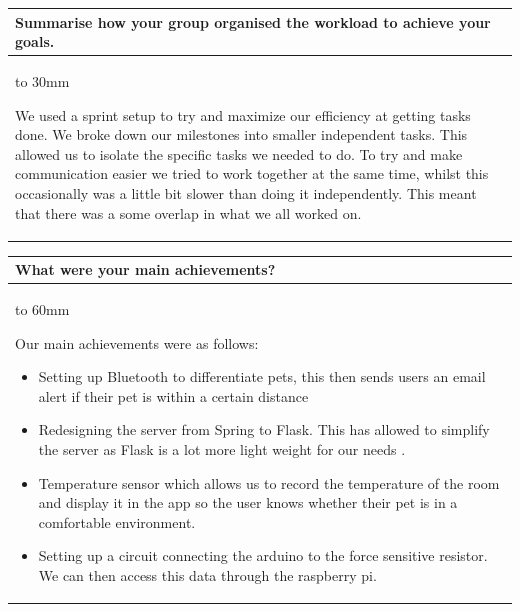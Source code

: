 \documentclass[a4paper]{article}
\newcommand{\colWidth}{141mm}
\begin{document}
\begin{center}
\begin{tabular}{|p{\colWidth}|}
	\hline
	\cellcolor{blue!25}\large
	\textbf{Summarise how your group organised the workload to achieve your goals.}
	\\ \hline
	\vtop to 30mm{
We used a sprint setup to try and maximize our efficiency at getting tasks done. We broke down our milestones into smaller independent tasks. This allowed us to isolate the specific tasks we needed to do. 
To try and make communication easier we tried to work together at the same time, whilst this occasionally was a little bit slower than doing it independently.  This meant that there was a some overlap in what we all worked on.


  }
  \\
  \hline
\end{tabular}
\vskip 5mm


\begin{tabular}{|p{\colWidth}|}
	\hline
	\cellcolor{blue!25}\large
	\textbf{What were your main achievements?}
	\\ \hline
	\vtop to 60mm{
Our main achievements were as follows:
\begin{itemize}
\item Setting up Bluetooth to differentiate pets, this then sends users an email alert if their pet is within a certain distance
\item Redesigning the server from Spring to Flask. This has allowed to simplify the server as Flask is a lot more light weight for our needs .
\item Temperature sensor which allows us to record the temperature of the room and display it in the app so the user knows whether their pet is in a comfortable environment.
\item Setting up a circuit connecting the arduino to the force sensitive resistor. We can then access this data through the raspberry pi.
\end{itemize}
  }
  \\
  \hline
\end{tabular}
\vskip 5mm



\end{center}
\end{document}
